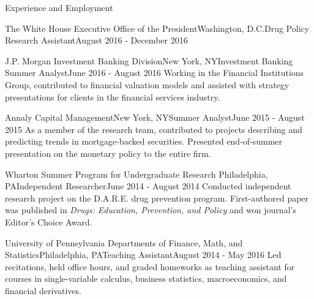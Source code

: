 \documentclass{resume} %
\begin{document}
\begin{rSection}{Experience and Employment}
\begin{rSubsection}{The White House Executive Office of the President}{Washington, D.C.}{Drug Policy Research Assistant}{August 2016 - December 2016}
\end{rSubsection}
\begin{rSubsection}{J.P. Morgan Investment Banking Division}{New York, NY}{Investment Banking Summer Analyst}{June 2016 - August 2016}
Working in the Financial Institutions Group, contributed to financial valuation models and assisted with strategy presentations for clients in the financial services industry.
\end{rSubsection}
\begin{rSubsection}{Annaly Capital Management}{New York, NY}{Summer Analyst}{June 2015 - August 2015}
As a member of the research team, contributed to projects describing and predicting trends in mortgage-backed securities. Presented end-of-summer presentation on the monetary policy to the entire firm.
\end{rSubsection}
\begin{rSubsection}{Wharton Summer Program for Undergraduate Research }{Philadelphia, PA}{Independent Researcher}{June 2014 - August 2014}
Conducted independent research project on the D.A.R.E. drug prevention program. First-authored paper was published in \emph{Drugs: Education, Prevention, and Policy} and won journal's Editor's Choice Award.
\end{rSubsection}
\begin{rSubsection}{University of Pennsylvania Departments of Finance, Math, and Statistics}{Philadelphia, PA}{Teaching Assistant}{August 2014 - May 2016}
Led recitations, held office hours, and graded homeworks as teaching assistant for courses in single-variable calculus, business statistics, macroeconomics, and financial derivatives.
\end{rSubsection}
\end{rSection}
\end{document}
